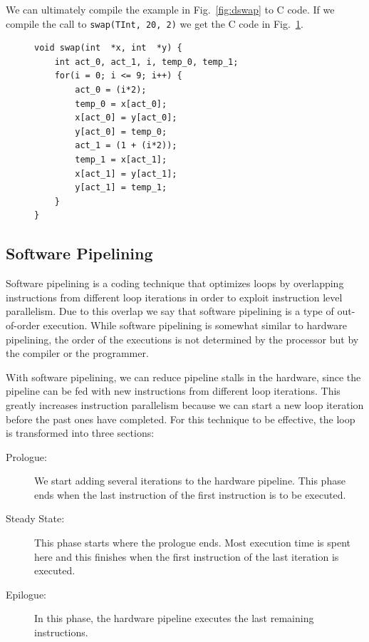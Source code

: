 \documentclass[10pt]{article}
\begin{document}
We can ultimately compile the example in Fig.~\ref{fig:dswap} to C code. If we compile the call to \texttt{swap(TInt, 20, 2)}
we get the C code in Fig.~\ref{fig:dswap_compiled}.

\lstset{basicstyle=\small,language=C}

\begin{figure}[ht]
\begin{lstlisting}
void swap(int  *x, int  *y) {
    int act_0, act_1, i, temp_0, temp_1;
    for(i = 0; i <= 9; i++) {
        act_0 = (i*2);
        temp_0 = x[act_0];
        x[act_0] = y[act_0];
        y[act_0] = temp_0;
        act_1 = (1 + (i*2));
        temp_1 = x[act_1];
        x[act_1] = y[act_1];
        y[act_1] = temp_1;
    }
}
\end{lstlisting}
\label{fig:dswap_compiled}
\end{figure}

\subsection{Software Pipelining}

Software pipelining is a coding technique that optimizes loops by overlapping instructions
from different loop iterations in order to exploit instruction level parallelism.
Due to this overlap we say that software pipelining is a type of out-of-order execution.
While software pipelining is somewhat similar to hardware pipelining, the order of the executions
is not determined by the processor but by the compiler or the programmer.

With software pipelining, we can reduce
pipeline stalls in the hardware, since the pipeline can be fed with new instructions from
different loop iterations. This greatly increases instruction parallelism because we can
start a new loop iteration before the past ones have completed. For this technique to be
effective, the loop is transformed into three sections:

\begin{description}
   \item[Prologue:] We start adding several iterations to the hardware pipeline.
   This phase ends when the last instruction of the first instruction is to be executed.

   \item[Steady State:] This phase starts where the prologue ends. Most execution time is spent
   here and this finishes when the first instruction of the last iteration is executed.

   \item[Epilogue:] In this phase, the hardware pipeline executes the last remaining instructions.
\end{description}
\end{document}
